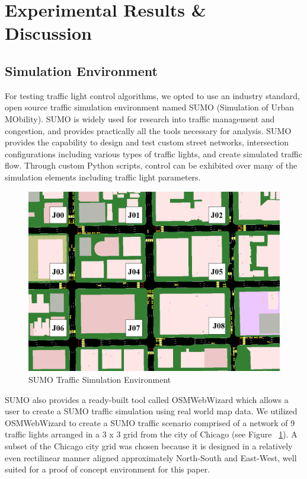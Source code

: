 \documentclass[twocolumn]{article}
\begin{document}
\section{Experimental Results \& \\ Discussion}

\subsection{Simulation Environment}

For testing traffic light control algorithms, we opted to use an industry standard, open source traffic simulation environment named SUMO (Simulation of Urban MObility). SUMO is widely used for research into traffic management and congestion, and provides practically all the tools necessary for analysis. SUMO provides the capability to design and test custom street networks, intersection configurations including various types of traffic lights, and create simulated traffic flow.  Through custom Python scripts, control can be exhibited over many of the simulation elements including traffic light parameters.

\begin{figure}[htp]
    \centering
    \includegraphics[width=\linewidth]{figures/sumo_chicago2_sim.PNG}
    \caption{SUMO Traffic Simulation Environment}
    \label{fig:sumo_sim}
\end{figure}

SUMO also provides a ready-built tool called OSMWebWizard which allows a user to create a SUMO traffic simulation using real world map data. We utilized OSMWebWizard to create a SUMO traffic scenario comprised of a network of 9 traffic lights arranged in a 3 x 3 grid from the city of Chicago (see Figure ~\ref{fig:sumo_sim}). A subset of the Chicago city grid was chosen because it is designed in a relatively even rectilinear manner aligned approximately North-South and East-West, well suited for a proof of concept environment for this paper.
\end{document}
